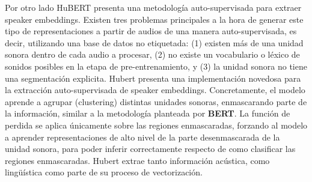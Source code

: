 Por otro lado HuBERT \cite{hubert} presenta una metodología auto-supervisada para extraer speaker embeddings. Existen tres problemas principales a la hora de generar este tipo de representaciones a partir de audios de una manera auto-supervisada, es decir, utilizando una base de datos no etiquetada: (1) existen más de una unidad sonora dentro de cada audio a procesar, (2) no existe un vocabulario o léxico de sonidos posibles en la etapa de pre-entrenamiento, y (3) la unidad sonora no tiene una segmentación explicita. Hubert presenta una implementación novedosa para la extracción auto-supervisada de speaker embeddings. Concretamente, el modelo aprende a agrupar (clustering) distintas unidades sonoras, enmascarando parte de la información, similar a la metodología planteada por \textbf{BERT}. La función de perdida se aplica únicamente sobre las regiones enmascaradas, forzando al modelo a aprender representaciones de alto nivel de la parte desenmascarada de la unidad sonora, para poder inferir correctamente respecto de como clasificar las regiones enmascaradas. Hubert extrae tanto información acústica, como lingüística como parte de su proceso de vectorización.

\newpage